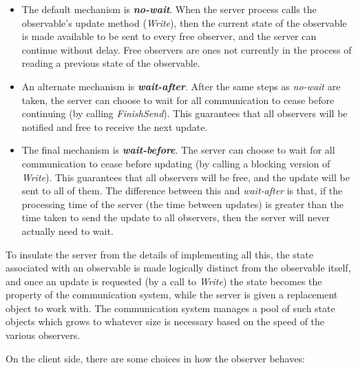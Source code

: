 \begin{itemize} \pflist

\item The default mechanism is \textbf{\textit{no-wait}}.  When the
server process calls the observable's update method ({\it Write}),
then the current state of the observable is made available to be sent
to every free observer, and the server can continue without delay.
Free observers are ones not currently in the process of reading a
previous state of the observable.

\item An alternate mechanism is \textbf{\textit{wait-after}}.  After the same 
steps as {\it no-wait} are taken, the server can choose
to wait for all communication to cease before continuing (by 
calling {\it FinishSend}).  This guarantees that all observers will
be notified and free to receive the next update.

\item The final mechanism is \textbf{\textit{wait-before}}.  The server can choose
to wait for all communication to cease before updating (by calling a
blocking version of {\it Write}).  This guarantees that all observers
will be free, and the update will be sent to all of them.  The
difference between this and {\it wait-after} is that, if the processing
time of the server (the time between updates) is greater than the time 
taken to send the update to all observers, then the server will never
actually need to wait.

\end{itemize}

\noindent
%
To insulate the server from the details of implementing all this, the
state associated with an observable is made logically distinct from
the observable itself, and once an update is requested (by a call to
{\em Write}) the state becomes the property of the communication
system, while the server is given a replacement object to work with.
%
The communication system manages a pool of such state objects which
grows to whatever size is necessary based on the speed of the various
observers.
%

On the client side, there are some choices in how the
observer behaves:

